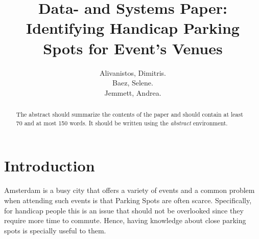 \documentclass[runningheads,a4paper]{../../StyleFiles/llncs}
\begin{document}
\mainmatter  %

\title{Data- and Systems Paper: Identifying Handicap Parking Spots for Event's Venues}


%
%
\author{Alivanistos, Dimitris. \\ Baez, Selene. \\ Jemmett, Andrea. }
%


\maketitle


\begin{abstract}
The abstract should summarize the contents of the paper and should
contain at least 70 and at most 150 words. It should be written using the
\emph{abstract} environment.
\end{abstract}


\section{Introduction}
Amsterdam is a busy city that offers a variety of events and a common problem when attending such events is that Parking Spots are often scarce. Specifically, for handicap people this is an issue that should not be overlooked since they require more time to commute. Hence, having knowledge about close parking spots is specially useful to them. 
\end{document}
